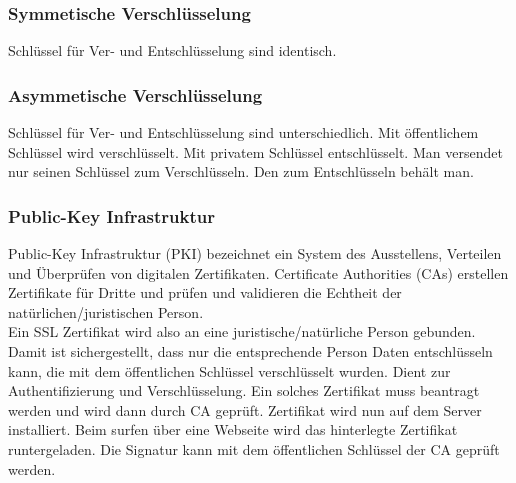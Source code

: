 \documentclass[12pt,a4paper]{article}
\begin{document}
\subsubsection{Symmetische Verschlüsselung}
Schlüssel für Ver- und Entschlüsselung sind identisch.

\subsubsection{Asymmetische Verschlüsselung}
Schlüssel für Ver- und Entschlüsselung sind unterschiedlich. Mit öffentlichem Schlüssel wird verschlüsselt. Mit privatem Schlüssel entschlüsselt. Man versendet nur seinen Schlüssel zum Verschlüsseln. Den zum Entschlüsseln behält man.

\subsubsection{Public-Key Infrastruktur}
Public-Key Infrastruktur (PKI) bezeichnet ein System des Ausstellens, Verteilen und Überprüfen von digitalen Zertifikaten. Certificate Authorities (CAs) erstellen Zertifikate für Dritte und prüfen und validieren die Echtheit der natürlichen/juristischen Person.\\
Ein SSL Zertifikat wird also an eine juristische/natürliche Person gebunden. Damit ist sichergestellt, dass nur die entsprechende Person Daten entschlüsseln kann, die mit dem öffentlichen Schlüssel verschlüsselt wurden. Dient zur Authentifizierung und Verschlüsselung. Ein solches Zertifikat muss beantragt werden und wird dann durch CA geprüft. Zertifikat wird nun auf dem Server installiert. Beim surfen über eine Webseite wird das hinterlegte Zertifikat runtergeladen. Die Signatur kann mit dem öffentlichen Schlüssel der CA geprüft werden.
\end{document}
